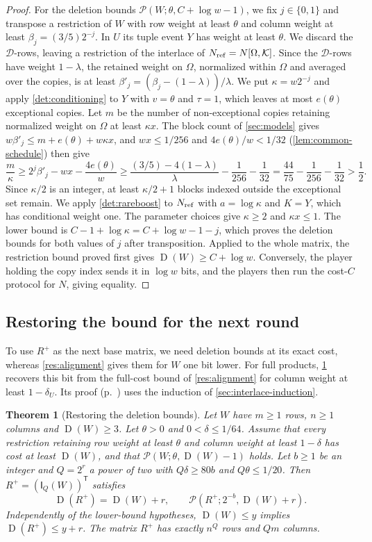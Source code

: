 \documentclass[11pt,letterpaper]{article} \usepackage[utf8]{inputenc}
\theoremstyle{plain} \newtheorem{theorem}{Theorem}[section]
\theoremstyle{definition} \newaliascnt{definition}{theorem}
\newcommand{\D}{\operatorname{D}}
\newcommand{\Int}[2]{\mathsf{I}_{#1}(#2)}
\newcommand{\RP}[3]{\mathcal{P}(#1;#2,#3)}
\begin{document}
\begin{proof}
For the deletion bounds $\RP{W}{\theta}{C+\log w-1}$, we fix $j\in\{0,1\}$ and transpose a restriction of $W$
with row weight at least $\theta$ and column weight at least
$\beta_j=(3/5)2^{-j}$. In $U$ its tuple event $Y$ has weight at least
$\theta$. We discard the $\mathcal D$-rows, leaving a restriction of
the interlace of $N_{\rm ref}=N[\Omega,\mathcal K]$. Since the $\mathcal D$-rows
have weight $1-\lambda$, the retained weight on $\Omega$, normalized within $\Omega$
and averaged over the copies, is at least
$\beta'_j=(\beta_j-(1-\lambda))/\lambda$.
We put $\kappa=w2^{-j}$ and apply \cref{det:conditioning} to $Y$ with $v=\theta$ and
$\tau=1$, which leaves at most $e(\theta)$ exceptional copies. Let $m$ be the number of
non-exceptional copies retaining normalized weight on $\Omega$ at least $\kappa x$.
The block count of \cref{sec:models} gives $w\beta'_j\le m+e(\theta)+w\kappa x$, and
$wx\le1/256$ and $4e(\theta)/w<1/32$ (\cref{lem:common-schedule}) then give
\[
 \frac m\kappa\ge2^j\beta'_j-wx-\frac{4e(\theta)}w
 \ge\frac{(3/5)-4(1-\lambda)}\lambda-\frac1{256}-\frac1{32}
 =\frac{44}{75}-\frac1{256}-\frac1{32}>\frac12.
\]
Since $\kappa/2$ is an integer, at least $\kappa/2+1$ blocks indexed outside the exceptional set remain. We apply
\cref{det:rareboost} to $N_{\rm ref}$ with $a=\log\kappa$ and $K=Y$,
which has conditional weight one. The parameter choices give $\kappa\ge2$ and
$\kappa x\le1$. The lower bound is
$C-1+\log\kappa=C+\log w-1-j$, which proves the deletion bounds for both values of $j$ after transposition.
Applied to the whole matrix, the restriction bound proved first gives $\D(W)\ge C+\log w$.
Conversely, the player holding the copy index sends it in $\log w$ bits, and
the players then run the cost-$C$ protocol for $N$, giving equality.
\end{proof}

\subsection{Restoring the bound for the next round}

To use $R^+$ as the next base matrix, we need deletion bounds at its exact
cost, whereas \cref{res:alignment} gives them for $W$ one bit lower. For full
products, \cref{cl:bridge} recovers this bit from the full-cost bound of
\cref{res:alignment} for column weight at least $1-\delta_U$. Its proof
(p.~\pageref{proof:cl:bridge}) uses the induction of \cref{sec:interlace-induction}.

\begin{theorem}[Restoring the deletion bounds]\label{cl:bridge}
Let $W$ have $m\ge1$ rows, $n\ge1$ columns and $\D(W)\ge3$. Let $\theta>0$ and $0<\delta\le1/64$. Assume that every
restriction retaining row weight at least $\theta$ and column weight at least
$1-\delta$ has cost at least $\D(W)$, and that $\RP{W}{\theta}{\D(W)-1}$ holds.
Let $b\ge1$ be an integer and $Q=2^r$ a power of two with
$Q\delta\ge80b$ and $Q\theta\le1/20$. Then $R^+=(\Int{Q}{W})^{\mathsf T}$
satisfies
\[
\D(R^+)=\D(W)+r,\qquad \RP{R^+}{2^{-b}}{\D(W)+r}.
\]
Independently of the lower-bound hypotheses, $\D(W)\le y$ implies
$\D(R^+)\le y+r$. The matrix $R^+$ has exactly $n^Q$ rows
and $Qm$ columns.
\end{theorem}
\end{document}
